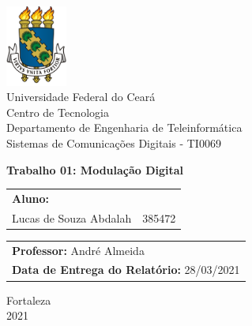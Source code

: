 \begin{titlepage}
    \begin{center}
        \includegraphics[width=2cm]{adj/brasao.png}\\
        {\large {Universidade Federal do Ceará}}\\
        {\large {Centro de Tecnologia}}\\
        {\large {Departamento de Engenharia de Teleinformática}}\\
        {\large {Sistemas de Comunicações Digitais - TI0069}}
    \end{center}

    \vspace{100pt}
    
    \begin{center}
        {\large \textbf {Trabalho 01: Modulação Digital}}
    \end{center}
    
    \vspace{100pt}
    
    \begin{table}[h]
    \begin{tabular}{ll}
        \textbf{Aluno:}         &       \\
        Lucas de Souza Abdalah  & 385472
    \end{tabular}
    \end{table}
    
    \begin{table}[h]
    \begin{tabular}{l}
        \textbf{Professor:} André Almeida   \\
        \textbf{Data de Entrega do Relatório:} 28/03/2021
    \end{tabular}
    \end{table}
    
    \vspace{\fill}
    
    \begin{center}
        Fortaleza\\
        2021
    \end{center}
    
    \end{titlepage}
    
    
    \tableofcontents
    \thispagestyle{empty}
    \clearpage